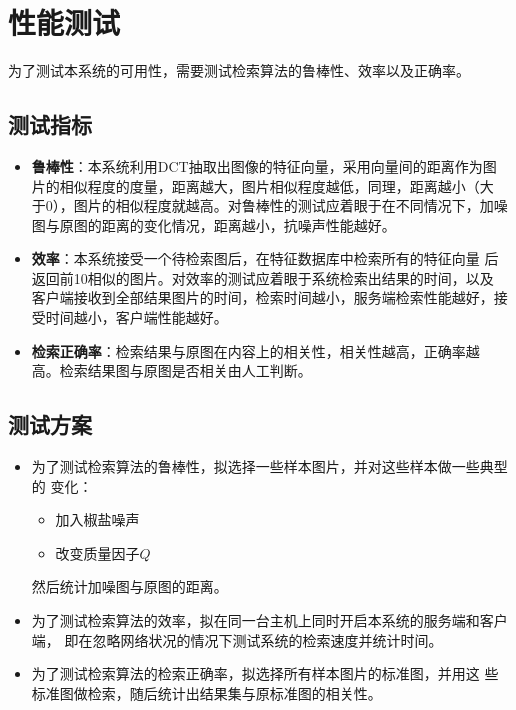 
\newcommand{\insimg}[1] {
  \begin{subfigure}[b]{0.2\textwidth}
    \centering
    \texttt{[image: images/\#1]}
  \end{subfigure}
}

\chapter{性能测试}
\label{chap:benchmark}

为了测试本系统的可用性，需要测试检索算法的鲁棒性、效率以及正确率。

\section{测试指标}
\label{sec:benchmark-index}

\begin{itemize}
\item \textbf{鲁棒性}：本系统利用DCT抽取出图像的特征向量，采用向量间的距离作为图
  片的相似程度的度量，距离越大，图片相似程度越低，同理，距离越小（大
  于0），图片的相似程度就越高。对鲁棒性的测试应着眼于在不同情况下，加噪
  图与原图的距离的变化情况，距离越小，抗噪声性能越好。

\item \textbf{效率}：本系统接受一个待检索图后，在特征数据库中检索所有的特征向量
  后返回前10相似的图片。对效率的测试应着眼于系统检索出结果的时间，以及
  客户端接收到全部结果图片的时间，检索时间越小，服务端检索性能越好，接
  受时间越小，客户端性能越好。

\item \textbf{检索正确率}：检索结果与原图在内容上的相关性，相关性越高，正确率越
  高。检索结果图与原图是否相关由人工判断。
\end{itemize}
\section{测试方案}
\label{sec:benchmark-scheme}

\begin{itemize}
\item 为了测试检索算法的鲁棒性，拟选择一些样本图片，并对这些样本做一些典型的
变化：
\begin{itemize}
\item 加入椒盐噪声
\item 改变质量因子$Q$
\end{itemize}
然后统计加噪图与原图的距离。

\item 为了测试检索算法的效率，拟在同一台主机上同时开启本系统的服务端和客户端，
即在忽略网络状况的情况下测试系统的检索速度并统计时间。

\item 为了测试检索算法的检索正确率，拟选择所有样本图片的标准图，并用这
  些标准图做检索，随后统计出结果集与原标准图的相关性。
\end{itemize}

